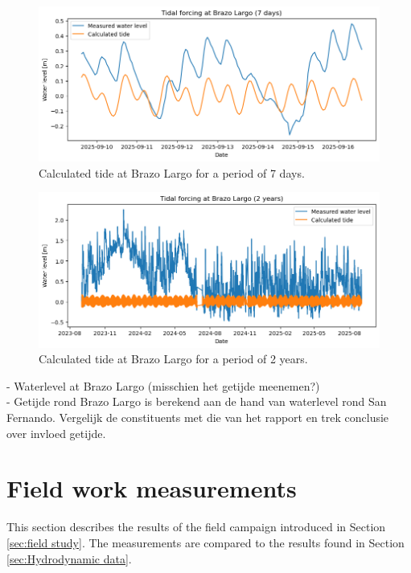 \begin{figure}[H]
    \centering
    \includegraphics[width=1\linewidth]{figures/ch5/Tide_Brazo_largo.png}
    \caption{Calculated tide at Brazo Largo for a period of 7 days.}
    \label{fig:period 7}
\end{figure}
\begin{figure}[H]
    \centering
    \includegraphics[width=1\linewidth]{figures/ch5/Tide_BL_2y.png}
    \caption{Calculated tide at Brazo Largo for a period of 2 years.}
    \label{fig:period 2}
\end{figure}

- Waterlevel at Brazo Largo
    (misschien het getijde meenemen?)
\\ - Getijde rond Brazo Largo is berekend aan de hand van waterlevel rond San Fernando. Vergelijk de constituents met die van  het rapport en trek conclusie over invloed getijde.


\newpage
\section{Field work measurements}
This section describes the results of the field campaign introduced in Section \ref{sec:field study}. The measurements are compared to the results found in Section \ref{sec:Hydrodynamic data}.


